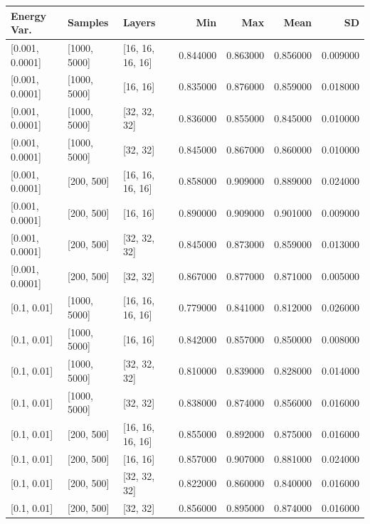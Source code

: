 \begin{tabular}{lllrrrr}
\toprule
Energy Var. & Samples & Layers & Min & Max & Mean & SD \\
\midrule
{[0.001, 0.0001]} & [1000, 5000] & [16, 16, 16, 16] & 0.844000 & 0.863000 & 0.856000 & 0.009000 \\
{[0.001, 0.0001]} & [1000, 5000] & [16, 16] & 0.835000 & 0.876000 & 0.859000 & 0.018000 \\
{[0.001, 0.0001]} & [1000, 5000] & [32, 32, 32] & 0.836000 & 0.855000 & 0.845000 & 0.010000 \\
{[0.001, 0.0001]} & [1000, 5000] & [32, 32] & 0.845000 & 0.867000 & 0.860000 & 0.010000 \\
{[0.001, 0.0001]} & [200, 500] & [16, 16, 16, 16] & 0.858000 & 0.909000 & 0.889000 & 0.024000 \\
{[0.001, 0.0001]} & [200, 500] & [16, 16] & 0.890000 & 0.909000 & 0.901000 & 0.009000 \\
{[0.001, 0.0001]} & [200, 500] & [32, 32, 32] & 0.845000 & 0.873000 & 0.859000 & 0.013000 \\
{[0.001, 0.0001]} & [200, 500] & [32, 32] & 0.867000 & 0.877000 & 0.871000 & 0.005000 \\
{[0.1, 0.01]} & [1000, 5000] & [16, 16, 16, 16] & 0.779000 & 0.841000 & 0.812000 & 0.026000 \\
{[0.1, 0.01]} & [1000, 5000] & [16, 16] & 0.842000 & 0.857000 & 0.850000 & 0.008000 \\
{[0.1, 0.01]} & [1000, 5000] & [32, 32, 32] & 0.810000 & 0.839000 & 0.828000 & 0.014000 \\
{[0.1, 0.01]} & [1000, 5000] & [32, 32] & 0.838000 & 0.874000 & 0.856000 & 0.016000 \\
{[0.1, 0.01]} & [200, 500] & [16, 16, 16, 16] & 0.855000 & 0.892000 & 0.875000 & 0.016000 \\
{[0.1, 0.01]} & [200, 500] & [16, 16] & 0.857000 & 0.907000 & 0.881000 & 0.024000 \\
{[0.1, 0.01]} & [200, 500] & [32, 32, 32] & 0.822000 & 0.860000 & 0.840000 & 0.016000 \\
{[0.1, 0.01]} & [200, 500] & [32, 32] & 0.856000 & 0.895000 & 0.874000 & 0.016000 \\
\bottomrule
\end{tabular}
